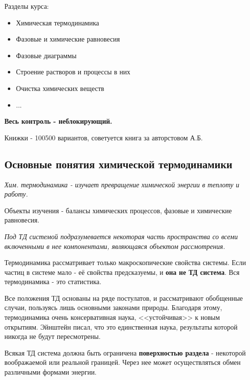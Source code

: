 \documentclass[11pt]{article}
\begin{document}
Разделы курса:

\begin{itemize}
\item Химическая термодинамика
\item Фазовые и химические равновесия
\item Фазовые диаграммы
\item Строение растворов и процессы в них
\item Очистка химических  веществ
\item ...
\end{itemize}

\textbf{Весь контроль - неблокирующий.}

Книжки - 100500 вариантов, советуется книга за авторстовом А.Б.

\subsection{Основные понятия химической термодинамики}

\emph{Хим. термодинамика - изучает превращение химической энергии в теплоту и работу.}

Объекты изучения - балансы химических процессов, фазовые и химические равновесия.

\emph{Под  ТД системой подразумевается некоторая часть пространства со всеми включенными в нее компонентами, являющаяся объектом рассмотрения.}

Термодинамика рассматривает только макроскопические свойства системы. Если частиц в системе мало - её свойства предсказуемы, и \textbf{она не ТД система}. Вся термодинамика - это статистика.

Все положения ТД основаны на ряде постулатов, и рассматривают обобщенные случаи, пользуясь лишь основными законами природы. Благодаря этому, термодинамика очень консервативная наука, <<устойчивая>> к новым открытиям. Эйнштейн писал, что это единственная наука, результаты которой никогда не будут пересмотрены.

Всякая ТД система должна быть ограничена \textbf{поверхностью раздела} - некоторой воображаемой или реальной границей. Через нее может осуществляться обмен различными формами энергии. 
\end{document}
